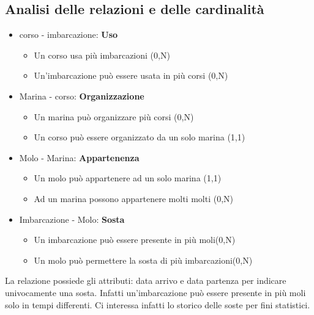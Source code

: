 \subsection{Analisi delle relazioni e delle cardinalità}

\begin{itemize}
    \item corso - imbarcazione: \textbf{Uso}
    \begin{itemize}
        \item Un corso usa più imbarcazioni (0,N)
        \item Un'imbarcazione può essere usata in più corsi (0,N)
    \end{itemize}
    
    \item Marina - corso: \textbf{Organizzazione}
    \begin{itemize}
        \item Un marina può organizzare più corsi (0,N)
        \item Un corso può essere organizzato da un solo marina (1,1)
    \end{itemize}
    
    \item Molo - Marina: \textbf{Appartenenza}
    \begin{itemize}
        \item Un molo può appartenere ad un solo marina (1,1)
        \item Ad un marina possono appartenere molti molti (0,N)
    \end{itemize}
    
    \item Imbarcazione - Molo: \textbf{Sosta}
    \begin{itemize}
        \item Un imbarcazione può essere presente in più moli(0,N)
        \item Un molo può permettere la sosta di più imbarcazioni(0,N)
    \end{itemize}
\end{itemize}

La relazione possiede gli attributi: data arrivo e data partenza per indicare univocamente una sosta. Infatti un'imbarcazione può essere presente in più moli solo in tempi differenti. Ci interessa infatti lo storico delle soste per fini statistici.

